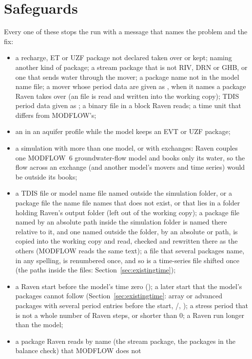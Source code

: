 \section{Safeguards}
Every one of these stops the run with a message that names the problem and the fix:
\begin{itemize}
\item a recharge, ET or UZF package not declared taken over or kept;  naming another kind of package;
      a stream package that is not RIV, DRN or GHB, or one that sends water through the mover; a package name not in the
      model name file; a mover whose period data are given as , when it names a package Raven takes over (an
       file is read and written into the working copy); TDIS period data given as ; a binary  file in a block
      Raven reads; a time unit that differs from MODFLOW's;
\item an  in an aquifer profile while the model keeps an EVT or UZF package;
\item a simulation with more than one model, or with exchanges: Raven couples one MODFLOW~6 groundwater-flow model and books
      only its water, so the flow across an exchange (and another model's movers and time series) would be outside its books;
\item a TDIS file or model name file named outside the simulation folder, or a package file the name file names that does
      not exist, or that lies in a folder holding Raven's output folder (left out of the working copy); a package file named
      by an absolute path inside the simulation folder is named there relative to it, and one named outside the folder, by
      an absolute or  path, is copied into the working copy and read, checked and rewritten there as the others
      (MODFLOW reads the same text); a file that several packages name, in any spelling, is renumbered once, and so is a
      time-series file shifted once (the paths inside the files: Section~\ref{sec:existingtime});
\item a Raven start before the model's time zero (); a later start that the model's packages cannot
      follow (Section~\ref{sec:existingtime}: array or advanced packages with several period entries before the start, /,
      ); a stress period that is not a whole number of Raven steps,
      or shorter than 0; a Raven run longer than the model;
\item a package Raven reads by name (the stream package, the packages in the balance check) that MODFLOW does not

\end{itemize}
